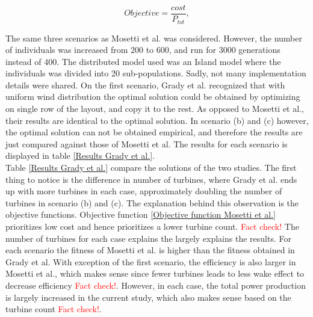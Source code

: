 \begin{equation}
Objective = \frac{cost}{P_{tot}},
\label{Objective function Grady et al.}
\end{equation}


\noindent The same three scenarios as Mosetti et al. was considered. However, the number of individuals was increased from 200 to 600, and run for 3000 generations instead of 400. The distributed model used was an Island model where the individuals was divided into 20 sub-populations. Sadly, not many implementation details were shared. On the first scenario, Grady et al. recognized that with uniform wind distribution the optimal solution could be obtained by optimizing on single row of the layout, and copy it to the rest. As opposed to Mosetti et al., their results are identical to the optimal solution. In scenario (b) and (c) however, the optimal solution can not be obtained empirical, and therefore the results are just compared against those of Mosetti et al. The results for each scenario is displayed in table \ref{Results Grady et al.}. \\

\noindent Table \ref{Results Grady et al.} compare the solutions of the two studies. The first thing to notice is the difference in number of turbines, where Grady et al. ends up with more turbines in each case, approximately doubling the number of turbines in scenario (b) and (c). The explanation behind this observation is the objective functions. Objective function \ref{Objective function Mosetti et al.} prioritizes low cost and hence prioritizes a lower turbine count. \textcolor{red}{Fact check!} The number of turbines for each case explains the largely explains the results. For each scenario the fitness of Mosetti et al. is higher than the fitness obtained in Grady et al. With exception of the first scenario, the efficiency is also larger in Mosetti et al., which makes sense since fewer turbines leads to less wake effect to decrease efficiency \textcolor{red}{Fact check!}. However, in each case, the total power production is largely increased in the current study, which also makes sense based on the turbine count \textcolor{red}{Fact check!}. \\



